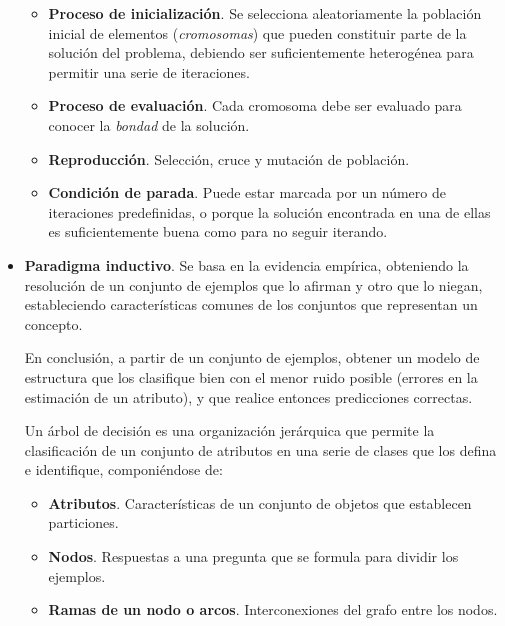 \documentclass[a4paper, 11pt, titlepage]{article}
\begin{document}
\begin{itemize}
                \begin{itemize}
                    \item \textbf{Proceso de inicialización}. Se selecciona aleatoriamente 
                    la población inicial de elementos (\textit{cromosomas}) que pueden constituir
                    parte de la solución del problema, debiendo ser suficientemente heterogénea 
                    para permitir una serie de iteraciones.
                    \item \textbf{Proceso de evaluación}. Cada cromosoma debe ser evaluado para 
                    conocer la \textit{bondad} de la solución.
                    \item \textbf{Reproducción}. Selección, cruce y mutación de población.
                    \item \textbf{Condición de parada}. Puede estar marcada por un número 
                    de iteraciones predefinidas, o porque la solución encontrada en una de 
                    ellas es suficientemente buena como para no seguir iterando.
                \end{itemize}

                \item \textbf{Paradigma inductivo}. Se basa en la evidencia empírica, obteniendo 
                la resolución de un conjunto de ejemplos que lo afirman y otro que lo niegan, 
                estableciendo características comunes de los conjuntos que representan un concepto.

                En conclusión, a partir de un conjunto de ejemplos, obtener un modelo de estructura
                que los clasifique bien con el menor ruido posible (errores en la estimación de un 
                atributo), y que realice entonces predicciones correctas. 

                Un árbol de decisión es una organización jerárquica que permite la clasificación 
                de un conjunto de atributos en una serie de clases que los defina e identifique, 
                componiéndose de:
                
                \begin{itemize}
                    \item \textbf{Atributos}. Características de un conjunto de objetos que establecen 
                    particiones.
                    \item \textbf{Nodos}. Respuestas a una pregunta que se formula para dividir los ejemplos.
                    \item \textbf{Ramas de un nodo o arcos}. Interconexiones del grafo entre los nodos.
                \end{itemize}
                

\end{itemize}
\end{document}
